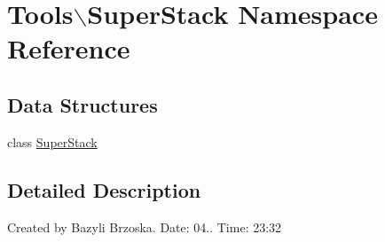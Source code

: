 \hypertarget{namespace_tools_1_1_super_stack}{
\section{\-Tools$\backslash$\-Super\-Stack \-Namespace \-Reference}
\label{namespace_tools_1_1_super_stack}
}
\subsection*{\-Data \-Structures}
\begin{DoxyCompactItemize}
\item 
class \hyperlink{class_tools_1_1_super_stack_1_1_super_stack}{\-Super\-Stack}
\end{DoxyCompactItemize}


\subsection{\-Detailed \-Description}
\-Created by \-Bazyli \-Brzoska. \-Date\-: 04.. \-Time\-: 23\-:32 